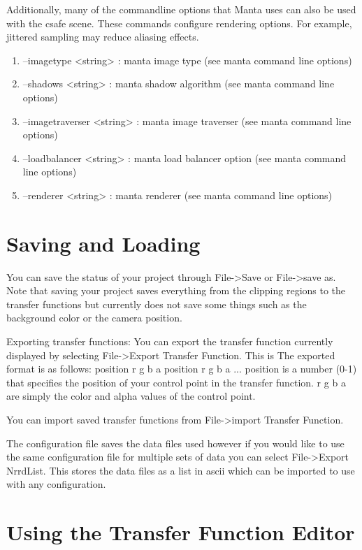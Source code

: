 Additionally, many of the commandline options that Manta uses can also be used with the csafe scene.  These commands configure rendering options.  For example, jittered sampling may reduce aliasing effects.

\begin{enumerate}

\item
--imagetype <string> : manta image type (see manta command line options)
\item
--shadows <string> : manta shadow algorithm (see manta command line options)
\item
--imagetraverser <string> : manta image traverser (see manta command line options)
\item
--loadbalancer <string> : manta load balancer option (see manta command line options)
\item
--renderer <string> : manta renderer (see manta command line options)


\end{enumerate}

\section{Saving and Loading}

You can save the status of your project through File->Save or File->save as. Note that saving your project saves everything from the clipping regions to the transfer functions but currently does not save some things such as the background color or the camera position.

Exporting transfer functions: You can export the transfer function currently displayed by selecting File->Export Transfer Function. This is The exported format is as follows: position r g b a position r g b a ... position is a number (0-1) that specifies the position of your control point in the transfer function. r g b a are simply the color and alpha values of the control point.

You can import saved transfer functions from File->import Transfer Function. 

The configuration file saves the data files used however if you would like to use the same configuration file for multiple sets of data you can select File->Export NrrdList.  This stores the data files as a list in ascii which can be imported to use with any configuration.  

\section{Using the Transfer Function Editor}

